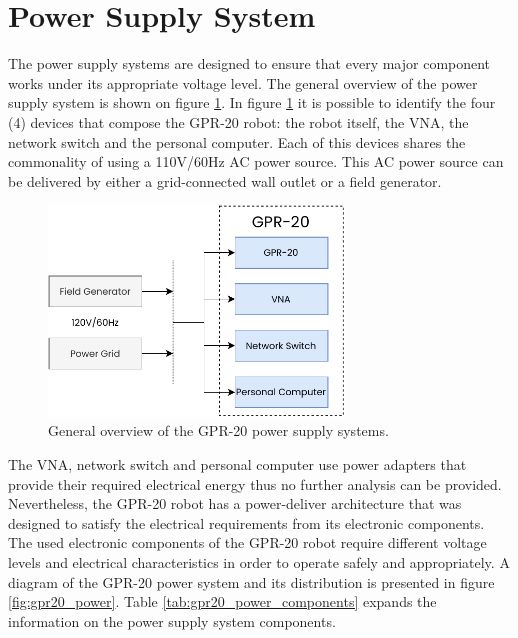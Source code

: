 \documentclass{article}
\begin{document}
\clearpage
\section{Power Supply System}
The power supply systems are designed to ensure that every major component works under its appropriate voltage level. The general overview of the power supply system is shown on figure \ref{fig:power_suplly_global}. In figure \ref{fig:power_suplly_global} it is possible to identify the four (4) devices that compose the GPR-20 robot: the robot itself, the VNA, the network switch and the personal computer. Each of this devices shares the commonality of using a 110V/60Hz AC power source. This AC power source can be delivered by either a grid-connected wall outlet or a field generator.

\begin{figure}[h]
    \centering
    \includegraphics[width=0.7\textwidth]{images/power/GPR20_power_general.pdf}
    \caption{General overview of the GPR-20 power supply systems.}
    \label{fig:power_suplly_global}
\end{figure}

The VNA, network switch and personal computer use power adapters that provide their required electrical energy thus no further analysis can be provided. Nevertheless, the GPR-20 robot has a power-deliver architecture that was designed to satisfy the electrical requirements from its electronic components. The used electronic components of the GPR-20 robot require different voltage levels and electrical characteristics in order to operate safely and appropriately. A diagram of the GPR-20 power system and its distribution is presented in figure \ref{fig:gpr20_power}. Table \ref{tab:gpr20_power_components} expands the information on the power supply system  components. 
\end{document}
